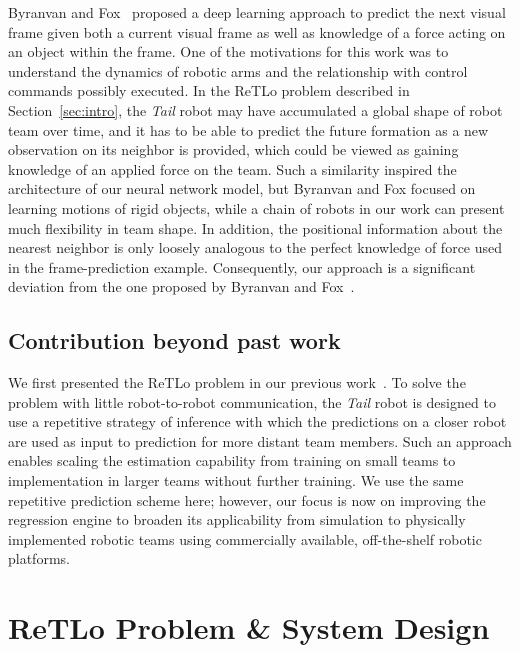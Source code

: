 \documentclass[letterpaper, 10 pt, conference]{ieeeconf}  %
\begin{document}
    Byranvan and Fox~\cite{BF17} proposed a deep learning approach to
    predict the next visual frame given both a current visual frame as
    well as knowledge of a force acting on an object within the frame.
    One of the motivations for this work was to understand the dynamics
    of robotic arms and the relationship with control commands possibly
    executed. In the ReTLo problem described in Section~\ref{sec:intro},
    the \emph{Tail} robot may have accumulated a global shape of robot
    team over time, and it has to be able to predict the future
    formation as a new observation on its neighbor is provided, which
    could be viewed as gaining knowledge of an applied force on the
    team. Such a similarity inspired the architecture of our neural
    network model, but Byranvan and Fox focused on learning motions of
    rigid objects, while a chain of robots in our work can present much
    flexibility in team shape. In addition, the positional information
    about the nearest neighbor is only loosely analogous to the perfect
    knowledge of force used in the frame-prediction example.
    Consequently, our approach is a significant deviation from the one
    proposed by Byranvan and Fox~\cite{BF17}.

	\subsection{Contribution beyond past work}
	\label{sec:scalable_teammate_localization}

    We first presented the ReTLo problem in our previous
    work~\cite{CPR17}. To solve the problem with little robot-to-robot
    communication, the \emph{Tail} robot is designed to use a repetitive
    strategy of inference with which the predictions on a closer robot
    are used as input to prediction for more distant team members. Such
    an approach enables scaling the estimation capability from training
    on small teams to implementation in larger teams without further
    training. We use the same repetitive prediction scheme here;
    however, our focus is now on improving the regression engine to
    broaden its applicability from simulation to physically implemented
    robotic teams using commercially available, off-the-shelf robotic
    platforms.

	\section{ReTLo Problem \& System Design}
	\label{sec:retlo_problem}
\end{document}
